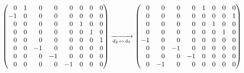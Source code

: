 \documentclass[a4paper,11pt]{article}
\begin{document}
\begin{equation}
  \label{eq:Wojtynski-25}
  \begin{split}
    &\begin{pmatrix}
       \hphantom{-} 0 & 1 & \hphantom{-} 0 & \hphantom{-} 0
       & \hphantom{-} 0 & 0 & 0 & 0 \\
       -1 & 0 & \hphantom{-} 0 & \hphantom{-} 0 & \hphantom{-} 0
                        & 0 & 0 & 0 \\
       \hphantom{-} 0 & 0 & \hphantom{-} 0 & \hphantom{-} 0
       & \hphantom{-} 0 & 1 & 0 & 0 \\
       \hphantom{-} 0 & 0 & \hphantom{-} 0 & \hphantom{-} 0
       & \hphantom{-} 0 & 0 & 1 & 0 \\
       \hphantom{-} 0 & 0 & \hphantom{-} 0 & \hphantom{-} 0
       & \hphantom{-} 0 & 0 & 0 & 1 \\
       \hphantom{-} 0 & 0 & -1 & \hphantom{-} 0 & \hphantom{-} 0
                        & 0 & 0 & 0 \\
       \hphantom{-} 0 & 0 & \hphantom{-} 0 & -1 & \hphantom{-} 0
                        & 0 & 0 & 0 \\
       \hphantom{-} 0 & 0 & \hphantom{-} 0 & \hphantom{-} 0 & -1
                        & 0 & 0 & 0
     \end{pmatrix}
      \xrightarrow[ d_{ 2 } \, \leftrightarrow \, d_{ 5 } ]{}
      \begin{pmatrix}
        \hphantom{-} 0 & \hphantom{-} 0 & \hphantom{-} 0 & \hphantom{-} 0
        & 1 & 0 & 0 & 0 \\
        \hphantom{-} 0 & \hphantom{-} 0 & \hphantom{-} 0 & \hphantom{-} 0
        & 0 & 0 & 0 & 1 \\
        \hphantom{-} 0 & \hphantom{-} 0 & \hphantom{-} 0 & \hphantom{-} 0
        & 0 & 1 & 0 & 0 \\
        \hphantom{-} 0 & \hphantom{-} 0 & \hphantom{-} 0 & \hphantom{-} 0
        & 0 & 0 & 1 & 0 \\
        -1 & \hphantom{-} 0 & \hphantom{-} 0 & \hphantom{-} 0 & 0 & 0 & 0
                    & 0 \\
        \hphantom{-} 0 & \hphantom{-} 0 & -1 & \hphantom{-} 0 & 0 & 0 & 0
                    & 0 \\
        \hphantom{-} 0 & \hphantom{-} 0 & \hphantom{-} 0 & -1 & 0 & 0 & 0
                    & 0 \\
        \hphantom{-} 0 & -1 & \hphantom{-} 0 & \hphantom{-} 0 & 0 & 0 & 0
                    & 0 \\

\end{pmatrix}
\end{split}
\end{equation}
\end{document}

